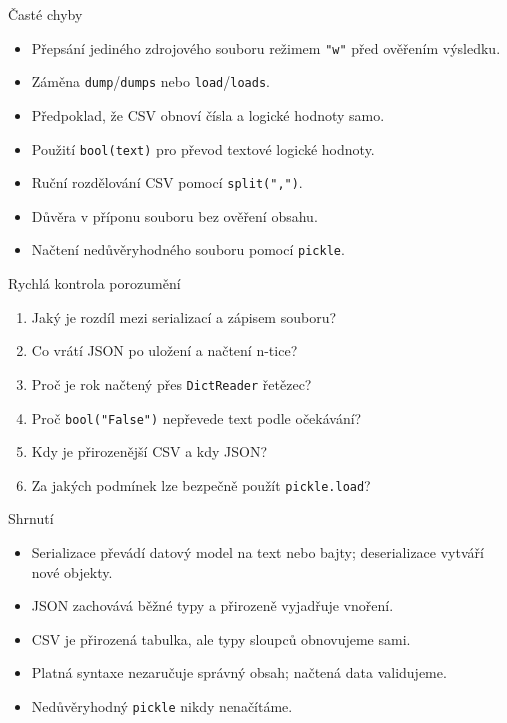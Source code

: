 \documentclass[aspectratio=169]{beamer}
\begin{document}
\begin{frame}{Časté chyby}
  \begin{itemize}
    \item Přepsání jediného zdrojového souboru režimem \texttt{"w"} před ověřením výsledku.
    \item Záměna \texttt{dump}/\texttt{dumps} nebo \texttt{load}/\texttt{loads}.
    \item Předpoklad, že CSV obnoví čísla a logické hodnoty samo.
    \item Použití \texttt{bool(text)} pro převod textové logické hodnoty.
    \item Ruční rozdělování CSV pomocí \texttt{split(",")}.
    \item Důvěra v příponu souboru bez ověření obsahu.
    \item Načtení nedůvěryhodného souboru pomocí \texttt{pickle}.
  \end{itemize}
\end{frame}

\begin{frame}{Rychlá kontrola porozumění}
  \begin{enumerate}
    \item Jaký je rozdíl mezi serializací a zápisem souboru?
    \item Co vrátí JSON po uložení a načtení n-tice?
    \item Proč je rok načtený přes \texttt{DictReader} řetězec?
    \item Proč \texttt{bool("False")} nepřevede text podle očekávání?
    \item Kdy je přirozenější CSV a kdy JSON?
    \item Za jakých podmínek lze bezpečně použít \texttt{pickle.load}?
  \end{enumerate}
\end{frame}

\begin{frame}{Shrnutí}
  \begin{itemize}
    \item Serializace převádí datový model na text nebo bajty; deserializace vytváří nové objekty.
    \item JSON zachovává běžné typy a přirozeně vyjadřuje vnoření.
    \item CSV je přirozená tabulka, ale typy sloupců obnovujeme sami.
    \item Platná syntaxe nezaručuje správný obsah; načtená data validujeme.
    \item Nedůvěryhodný \texttt{pickle} nikdy nenačítáme.
  \end{itemize}
\end{frame}
\end{document}
